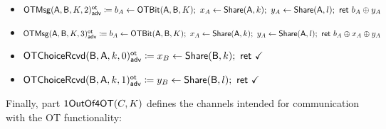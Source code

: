 \begin{itemize}
\begin{itemize}
\item {\color{blue} $\mathsf{OTMsg}(\mathsf{A},\mathsf{B},K,2)^{\mathsf{ot}}_{\mathsf{adv}} \coloneqq b_A \leftarrow \mathsf{OTBit}(\mathsf{A},\mathsf{B},K); \ x_A \leftarrow \mathsf{Share}(\mathsf{A},k); \ y_A \leftarrow \mathsf{Share}(\mathsf{A},l); \ \mathsf{ret} \ b_A \oplus y_A$}
\item {\color{blue} $\mathsf{OTMsg}(\mathsf{A},\mathsf{B},K,3)^{\mathsf{ot}}_{\mathsf{adv}} \coloneqq b_A \leftarrow \mathsf{OTBit}(\mathsf{A},\mathsf{B},K); \ x_A \leftarrow \mathsf{Share}(\mathsf{A},k); \ y_A \leftarrow \mathsf{Share}(\mathsf{A},l); \ \mathsf{ret} \ b_A \oplus x_A \oplus y_A$}\medskip
\item {\color{blue} $\mathsf{OTChoiceRcvd}(\mathsf{B},\mathsf{A},k,0)^{\mathsf{ot}}_{\mathsf{adv}} \coloneqq x_B \leftarrow \mathsf{Share}(\mathsf{B},k); \ \mathsf{ret} \ \checkmark$}
\item {\color{blue} $\mathsf{OTChoiceRcvd}(\mathsf{B},\mathsf{A},k,1)^{\mathsf{ot}}_{\mathsf{adv}} \coloneqq y_B \leftarrow \mathsf{Share}(\mathsf{B},l); \ \mathsf{ret} \ \checkmark$}
\end{itemize}
\end{itemize}

\noindent Finally, part $\mathsf{1OutOf4OT}(C,K)$ defines the channels intended for communication with the OT functionality:

